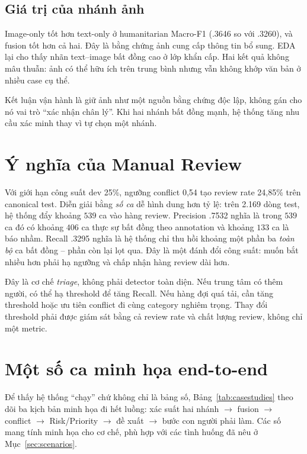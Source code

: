 \subsection{Giá trị của nhánh ảnh}

Image-only tốt hơn text-only ở humanitarian Macro-F1 (.3646 so với .3260), và
fusion tốt hơn cả hai. Đây là bằng chứng ảnh cung cấp thông tin bổ sung. EDA lại
cho thấy nhãn text--image bất đồng cao ở lớp khẩn cấp. Hai kết quả không mâu
thuẫn: ảnh có thể hữu ích trên trung bình nhưng vẫn không khớp văn bản ở nhiều
case cụ thể.

Kết luận vận hành là giữ ảnh như một nguồn bằng chứng độc lập, không gán cho nó
vai trò ``xác nhận chân lý''. Khi hai nhánh bất đồng mạnh, hệ thống tăng nhu cầu
xác minh thay vì tự chọn một nhánh.

\section{Ý nghĩa của Manual Review}

Với giới hạn công suất dev 25\%, ngưỡng conflict 0,54 tạo review rate 24,85\%
trên canonical test. Diễn giải bằng \emph{số ca} dễ hình dung hơn tỷ lệ: trên
2.169 dòng test, hệ thống đẩy khoảng \(539\) ca vào hàng review. Precision .7532
nghĩa là trong \(539\) ca đó có khoảng \(406\) ca thực sự bất đồng theo
annotation và khoảng \(133\) ca là báo nhầm. Recall .3295 nghĩa là hệ thống chỉ
thu hồi khoảng một phần ba \emph{toàn bộ} ca bất đồng -- phần còn lại lọt qua.
Đây là một đánh đổi công suất: muốn bắt nhiều hơn phải hạ ngưỡng và chấp nhận
hàng review dài hơn.

Đây là cơ chế \textit{triage}, không phải detector toàn diện. Nếu trung tâm có
thêm người, có thể hạ threshold để tăng Recall. Nếu hàng đợi quá tải, cần tăng
threshold hoặc ưu tiên conflict đi cùng category nghiêm trọng. Thay đổi threshold
phải được giám sát bằng cả review rate và chất lượng review, không chỉ một metric.

\section{Một số ca minh họa end-to-end}

Để thấy hệ thống ``chạy'' chứ không chỉ là bảng số, Bảng~\ref{tab:casestudies}
theo dõi ba kịch bản minh họa đi hết luồng: xác suất hai nhánh $\rightarrow$
fusion $\rightarrow$ conflict $\rightarrow$ Risk/Priority $\rightarrow$ đề xuất
$\rightarrow$ bước con người phải làm. Các số mang tính minh họa cho cơ chế, phù
hợp với các tình huống đã nêu ở Mục~\ref{sec:scenarios}.

